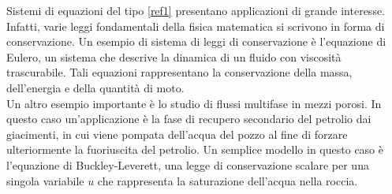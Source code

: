 \par Sistemi di equazioni del tipo \ref{ref1} presentano applicazioni di grande interesse.  Infatti, varie leggi fondamentali della fisica matematica si scrivono in forma di conservazione. Un esempio di sistema di leggi di conservazione è l'equazione di Eulero, un sistema che descrive la dinamica di un fluido con viscosità trascurabile. Tali equazioni rappresentano la conservazione della massa, dell’energia e della quantità di moto.\\
\noindent Un altro esempio importante è lo studio di flussi multifase in mezzi porosi. In questo caso un'applicazione è la fase di recupero secondario del petrolio dai giacimenti, in cui viene pompata dell'acqua del pozzo al fine di forzare ulteriormente la fuoriuscita del petrolio. Un semplice modello in questo caso è l'equazione di Buckley-Leverett, una legge di conservazione scalare per una singola variabile $u$ che rappresenta la saturazione dell'acqua nella roccia. 

